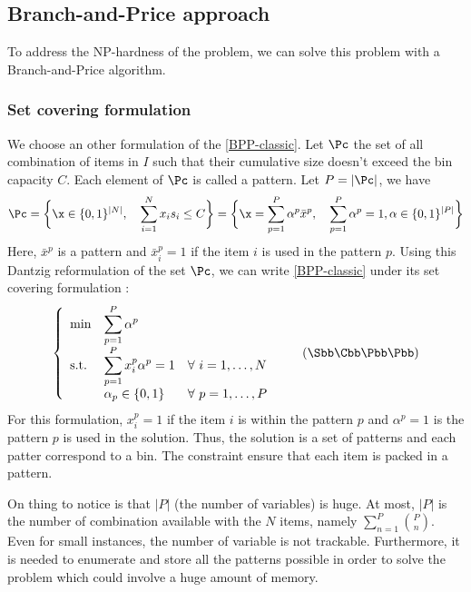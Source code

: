 \subsection{Branch-and-Price approach }

To address the NP-hardness of the problem, we can solve this problem with a Branch-and-Price algorithm.

\subsubsection{Set covering formulation}

We choose an other formulation of the \eqref{BPP-classic}. Let $\Pc$ the set of all combination of items in $I$ such that their cumulative size doesn't exceed the bin capacity $C$. Each element of $\Pc$ is called a pattern. Let $P=|\Pc|$, we have
\begin{equation*}
	\Pc = \bigg \{ \x \in \{0,1\}^{|N|}, \quad \sum_{i=1}^N x_i s_i \leq C \bigg \} = \bigg \{ \x = \sum_{p=1}^P \alpha^p \bar{x}^p, \quad \sum_{p=1}^P \alpha^p = 1, \alpha \in \{0,1\}^{|P|}  \bigg \}
\end{equation*}
Here, $\bar{x}^p$ is a pattern and $\bar{x}^p_i=1$ if the item $i$ is used in the pattern $p$. Using this Dantzig reformulation of the set $\Pc$, we can write \eqref{BPP-classic} under its set covering formulation :
\begin{equation}
	\label{SCBPP}
		\left \{
		\begin{array}{*5{>{\displaystyle}l}}
		\min & \sum_{p=1}^P \alpha^p \\
		\st & \sum_{p=1}^P x_i^p\alpha^p = 1 & \forall \ i = 1,\dots,N \\
		& \alpha_{p} \in \{0,1\} &  \forall \ p = 1,\dots,P
		\end{array}
		\right.
	\tag{$\Sbb\Cbb\Bbb\Pbb\Pbb$}
\end{equation}
For this formulation, $x_i^p=1$ if the item $i$ is within the pattern $p$ and $\alpha^p=1$ is the pattern $p$ is used in the solution. Thus, the solution is a set of patterns and each patter correspond to a bin. The constraint ensure that each item is packed in a pattern.

On thing to notice is that $|P|$ (the number of variables) is huge. At most, $|P|$ is the number of combination available with the $N$ items, namely $\sum_{n=1}^P \binom{P}{n}$. Even for small instances, the number of variable is not trackable. Furthermore, it is needed to enumerate and store all the patterns possible in order to solve the problem which could involve a huge amount of memory. 

